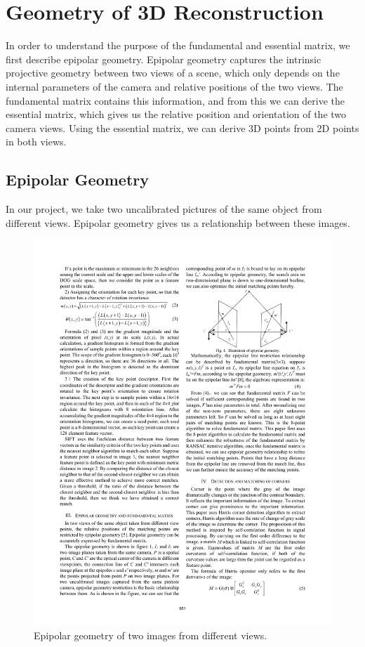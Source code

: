 \section{Geometry of 3D Reconstruction}
\label{s:fundamental}
In order to understand the purpose of the fundamental and essential matrix, we first describe epipolar geometry. Epipolar geometry captures the intrinsic projective geometry between two views of a scene, which only depends on the internal parameters of the camera and relative positions of the two views. The fundamental matrix contains this information, and from this we can derive the essential matrix, which gives us the relative position and orientation of the two camera views. Using the essential matrix, we can derive  3D points from 2D points in both views.

\subsection{Epipolar Geometry}
In our project, we take two uncalibrated pictures of the same object from different views. Epipolar geometry gives us a relationship between these images.
\begin{figure}[H]
\begin{center}
\includegraphics[width=0.9\linewidth]{figures/epipolar.pdf}
\end{center}
\caption{Epipolar geometry of two images from different views.}
\label{epipolar_pic}
\end{figure}

